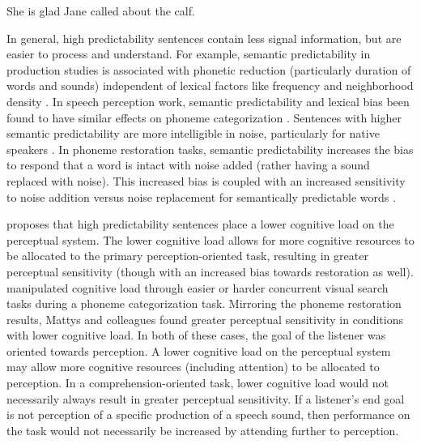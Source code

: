 \ex[exno=2]
She is glad Jane called about the calf.
\xe


In general, high predictability sentences contain less signal information, but are easier to process and understand.
For example, semantic predictability in production studies is associated with phonetic reduction (particularly duration of words and sounds) independent of lexical factors like frequency and neighborhood density \citep{Scarborough2010, Clopper2008}.  
In speech perception work, semantic predictability and lexical bias been found to have similar effects on phoneme categorization \citep{Connine1987,Borsky1998}.
Sentences with higher semantic predictability are more intelligible in noise, particularly for native speakers \citep[and others]{Kalikow1977, Mayo1997, Fallon2002, Bradlow2007}.
In phoneme restoration tasks, semantic predictability increases the bias to respond that a word is intact with noise added (rather having a sound replaced with noise).
This increased bias is coupled with an increased sensitivity to noise addition versus noise replacement for semantically predictable words \citep{Samuel1981}.

\citet{Samuel1981} proposes that high predictability sentences place a lower cognitive load on the perceptual system.  
The lower cognitive load allows for more cognitive resources to be allocated to the primary perception-oriented task, resulting in greater perceptual sensitivity (though with an increased bias towards restoration as well).
\citet{Mattys2011} manipulated cognitive load through easier or harder concurrent visual search tasks during a phoneme categorization task.
Mirroring the phoneme restoration results, Mattys and colleagues found greater perceptual sensitivity in conditions with lower cognitive load.
In both of these cases, the goal of the listener was oriented towards perception.
A lower cognitive load on the perceptual system may allow more cognitive resources (including attention) to be allocated to perception.
In a comprehension-oriented task, lower cognitive load would not necessarily always result in greater perceptual sensitivity. 
If a listener's end goal is not perception of a specific production of a speech sound, then performance on the task would not necessarily be increased by attending further to perception.


